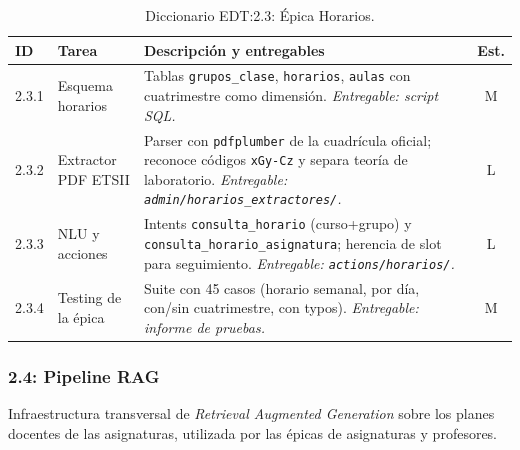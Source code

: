 \begin{table}[hbtp]
\centering
\small
\begin{tabular}{|l|l|p{7.5cm}|c|}
\hline
\textbf{ID} & \textbf{Tarea} & \textbf{Descripción y entregables} & \textbf{Est.} \\ \hline
2.3.1 & Esquema horarios & Tablas \texttt{grupos\_clase}, \texttt{horarios}, \texttt{aulas} con cuatrimestre como dimensión. \textit{Entregable: script SQL.} & M \\ \hline
2.3.2 & Extractor PDF ETSII & Parser con \texttt{pdfplumber} de la cuadrícula oficial; reconoce códigos \texttt{xGy-Cz} y separa teoría de laboratorio. \textit{Entregable: \texttt{admin/horarios\_extractores/}.} & L \\ \hline
2.3.3 & NLU y acciones & Intents \texttt{consulta\_horario} (curso+grupo) y \texttt{consulta\_horario\_asignatura}; herencia de slot para seguimiento. \textit{Entregable: \texttt{actions/horarios/}.} & L \\ \hline
2.3.4 & Testing de la épica & Suite con 45 casos (horario semanal, por día, con/sin cuatrimestre, con typos). \textit{Entregable: informe de pruebas.} & M \\ \hline
\end{tabular}
\caption{Diccionario EDT:2.3: Épica Horarios.}
\label{tab:dict-2-3}
\end{table}

\subsubsection{2.4: Pipeline RAG}\label{subsubsec:rag}

Infraestructura transversal de \textit{Retrieval Augmented Generation} sobre los planes docentes de las asignaturas, utilizada por las épicas de asignaturas y profesores.

